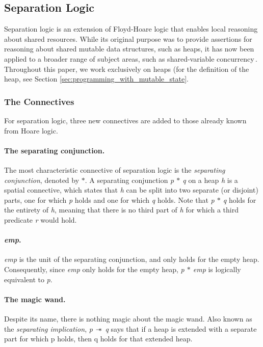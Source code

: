 \subsection{Separation Logic}
\label{sec:separation_logic}
Separation logic is an extension of Floyd-Hoare logic that enables local reasoning about shared resources. While its original purpose was to provide assertions for reasoning about shared mutable data structures, such as heaps, it has now been applied to a broader range of subject areas, such as shared-variable concurrency\,\cite{reynolds2008AnIntroductionTo}. Throughout this paper, we work exclusively on heaps (for the definition of the heap, see Section \ref{sec:programming_with_mutable_state}.\,\cite{reynolds2008AnIntroductionTo}

\subsubsection{The Connectives}
For separation logic, three new connectives are added to those already known from Hoare logic. 
\paragraph{The separating conjunction.}
The most characteristic connective of separation logic is the {\it separating conjunction}, denoted by {\it $\ast$}. A separating conjunction {\it p $\ast$ q} on a heap {\it h} is a spatial connective, which states that {\it h} can be split into two separate (or disjoint) parts, one for which {\it p} holds and one for which {\it q} holds. Note that {\it p $\ast$ q} holds for the entirety of {\it h}, meaning that there is no third part of {\it h} for which a third predicate {\it r} would hold.

\paragraph{{\it emp}.}
{\it emp} is the unit of the separating conjunction, and only holds for the empty heap. Consequently, since {\it emp} only holds for the empty heap, {\it p $\ast$ emp} is logically equivalent to {\it p}.

\paragraph{The magic wand.}
Despite its name, there is nothing magic about the magic wand. Also known as the {\it separating implication}, {\it p $\wand$ q} says that if a heap is extended with a separate part for which p holds, then q holds for that extended heap.

